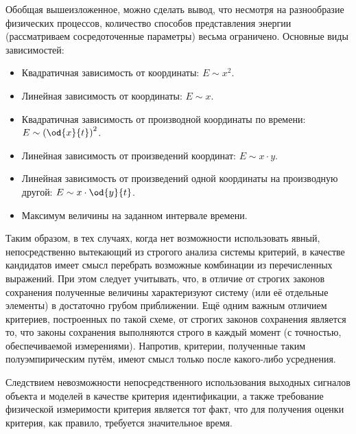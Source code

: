 Обобщая вышеизложенное, можно сделать вывод, что
несмотря на разнообразие физических процессов, количество способов
представления энергии (рассматриваем сосредоточенные параметры)
весьма ограничено. Основные виды зависимостей:

\begin{itemize}

  \item
    Квадратичная зависимость от координаты: $E \sim x^2$.

  \item
    Линейная зависимость от координаты: $E \sim x$.

  \item
    Квадратичная зависимость от производной координаты по времени: $E \sim \left( \od{x}{t}\right)^2$.

  \item
    Линейная зависимость от произведений координат: $E \sim x \cdot y$.

  \item
    Линейная зависимость от произведений одной координаты на производную другой: $E \sim x \cdot \od{y}{t}$.

  \item
    Максимум величины на заданном интервале времени.

\end{itemize}

Таким образом, в тех случаях, когда нет возможности
использовать явный, непосредственно вытекающий
из строгого анализа системы критерий, в качестве кандидатов
имеет смысл перебрать возможные комбинации из перечисленных выражений.
При этом следует учитывать, что, в отличие от строгих законов сохранения
полученные величины характеризуют систему (или её отдельные элементы)
в достаточно грубом приближении.
Ещё одним важным отличием критериев, построенных по такой схеме,
от строгих законов сохранения является то,
что законы сохранения выполняются строго в каждый момент
(с точностью, обеспечиваемой измерениями). Напротив,
критерии, полученные таким полуэмпирическим путём,
имеют смысл только после какого-либо усреднения.








Следствием невозможности непосредственного использования выходных
сигналов объекта и моделей в качестве критерия идентификации, а также
требование физической измеримости критерия является
тот факт, что для получения оценки критерия, как правило,
требуется значительное время.






